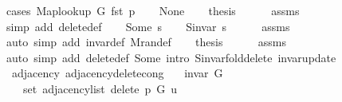 \begin{isabellebody}
%
\endisadelimproof
%
\isatagproof
{}\isamarkupfalse%
\ {\isacharparenleft}{\kern0pt}cases\ {\isachardoublequoteopen}Map{\isacharunderscore}{\kern0pt}lookup\ G\ {\isacharparenleft}{\kern0pt}fst\ p{\isacharparenright}{\kern0pt}{\isachardoublequoteclose}{\isacharparenright}{\kern0pt}\isanewline
\ \ \isamarkupfalse%
\ None\isanewline
\ \ \isamarkupfalse%
\ {\isacharquery}{\kern0pt}thesis\isanewline
\ \ \ \ \isamarkupfalse%
\ assms\isanewline
\ \ \ \ \isamarkupfalse%
\ {\isacharparenleft}{\kern0pt}simp\ add{\isacharcolon}{\kern0pt}\ delete{\isacharunderscore}{\kern0pt}{}{\isacharunderscore}{\kern0pt}def{\isacharparenright}{\kern0pt}\isanewline
{}\isamarkupfalse%
\isanewline
\ \ \isamarkupfalse%
\ {\isacharparenleft}{\kern0pt}Some\ s{\isacharparenright}{\kern0pt}\isanewline
\ \ \isamarkupfalse%
\ {\isachardoublequoteopen}S{\isachardot}{\kern0pt}invar\ s{\isachardoublequoteclose}\isanewline
\ \ \ \ \isamarkupfalse%
\ assms\isanewline
\ \ \ \ \isamarkupfalse%
\ {\isacharparenleft}{\kern0pt}auto\ simp\ add{\isacharcolon}{\kern0pt}\ invar{\isacharunderscore}{\kern0pt}def\ M{\isachardot}{\kern0pt}ran{\isacharunderscore}{\kern0pt}def{\isacharparenright}{\kern0pt}\isanewline
\ \ \isamarkupfalse%
\ {\isacharquery}{\kern0pt}thesis\isanewline
\ \ \ \ \isamarkupfalse%
\ assms\isanewline
\ \ \ \ \isamarkupfalse%
\ {\isacharparenleft}{\kern0pt}auto\ simp\ add{\isacharcolon}{\kern0pt}\ delete{\isacharunderscore}{\kern0pt}{}{\isacharunderscore}{\kern0pt}def\ Some\ intro{\isacharcolon}{\kern0pt}\ S{\isachardot}{\kern0pt}invar{\isacharunderscore}{\kern0pt}fold{\isacharunderscore}{\kern0pt}delete\ invar{\isacharunderscore}{\kern0pt}update{\isacharparenright}{\kern0pt}\isanewline
{}\isamarkupfalse%
%
\endisatagproof
{\isafoldproof}%
%
\isadelimproof
\isanewline
%
\endisadelimproof
\isanewline
{}\isamarkupfalse%
\ {\isacharparenleft}{\kern0pt}\ adjacency{\isacharparenright}{\kern0pt}\ adjacency{\isacharunderscore}{\kern0pt}delete{\isacharunderscore}{\kern0pt}{}{\isacharunderscore}{\kern0pt}cong{\isacharcolon}{\kern0pt}\isanewline
\ \ \ {\isachardoublequoteopen}invar\ G{\isachardoublequoteclose}\isanewline
\ \ \isanewline
\ \ \ \ {\isachardoublequoteopen}set\ {\isacharparenleft}{\kern0pt}adjacency{\isacharunderscore}{\kern0pt}list\ {\isacharparenleft}{\kern0pt}delete{\isacharunderscore}{\kern0pt}{}\ p\ G{\isacharparenright}{\kern0pt}\ u{\isacharparenright}{\kern0pt}\ {\isacharequal}{\kern0pt}\isanewline

\end{isabellebody}
